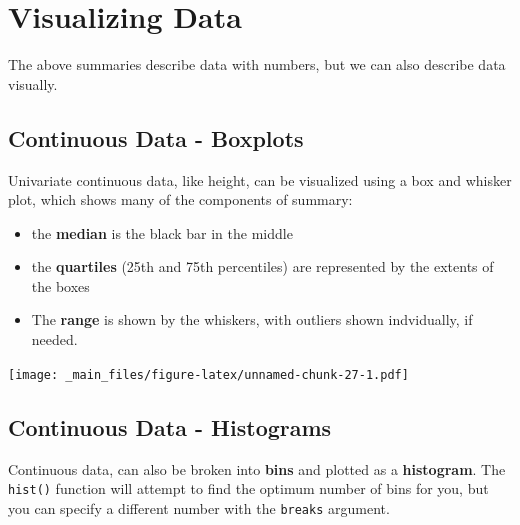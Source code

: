\documentclass[
]{book}
\newenvironment{Shaded}{\begin{snugshade}}{\end{snugshade}}
\newcommand{\FunctionTok}[1]{\textcolor[rgb]{0.00,0.00,0.00}{#1}}
\newcommand{\NormalTok}[1]{#1}
\newcommand{\SpecialCharTok}[1]{\textcolor[rgb]{0.00,0.00,0.00}{#1}}
\providecommand{\tightlist}{%
  \setlength{\itemsep}{0pt}\setlength{\parskip}{0pt}}
\begin{document}
\hypertarget{visualizing-data-1}{%
\chapter*{Visualizing Data}\label{visualizing-data-1}}

The above summaries describe data with numbers, but we can also describe data visually.

\hypertarget{continuous-data---boxplots-1}{%
\section*{Continuous Data - Boxplots}\label{continuous-data---boxplots-1}}

Univariate continuous data, like height, can be visualized using a box and whisker plot, which shows many of the components of summary:

\begin{itemize}
\tightlist
\item
  the \textbf{median} is the black bar in the middle
\item
  the \textbf{quartiles} (25th and 75th percentiles) are represented by the extents of the boxes
\item
  The \textbf{range} is shown by the whiskers, with outliers shown indvidually, if needed.
\end{itemize}

\begin{Shaded}
\end{Shaded}

\texttt{[image: \_main\_files/figure-latex/unnamed-chunk-27-1.pdf]}

\hypertarget{continuous-data---histograms-1}{%
\section*{Continuous Data - Histograms}\label{continuous-data---histograms-1}}

Continuous data, can also be broken into \textbf{bins} and plotted as a \textbf{histogram}. The \texttt{hist()} function will attempt to find the optimum number of bins for you, but you can specify a different number with the \texttt{breaks} argument.
\end{document}
